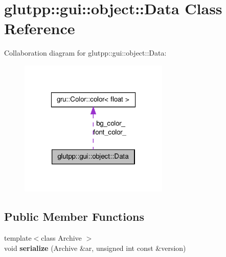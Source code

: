 \hypertarget{classglutpp_1_1gui_1_1object_1_1Data}{\section{glutpp\-:\-:gui\-:\-:object\-:\-:\-Data \-Class \-Reference}
\label{classglutpp_1_1gui_1_1object_1_1Data}
}


\-Collaboration diagram for glutpp\-:\-:gui\-:\-:object\-:\-:\-Data\-:\nopagebreak
\begin{figure}[H]
\begin{center}
\leavevmode
\includegraphics[width=202pt]{classglutpp_1_1gui_1_1object_1_1Data__coll__graph}
\end{center}
\end{figure}
\subsection*{\-Public \-Member \-Functions}
\begin{DoxyCompactItemize}
\item 
\hypertarget{classglutpp_1_1gui_1_1object_1_1Data_a91e87c77d8ed816368ec17551ef8a35b}{{\footnotesize template$<$class Archive $>$ }\\void {\bfseries serialize} (\-Archive \&ar, unsigned int const \&version)}\label{classglutpp_1_1gui_1_1object_1_1Data_a91e87c77d8ed816368ec17551ef8a35b}

\end{DoxyCompactItemize}
